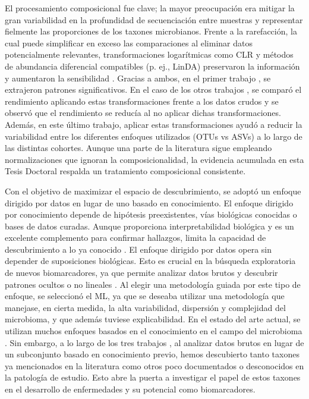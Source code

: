El procesamiento composicional fue clave; la mayor preocupación era mitigar la gran variabilidad en la profundidad de secuenciación entre muestras y representar fielmente las proporciones de los taxones microbianos. Frente a la rarefacción, la cual puede simplificar en exceso las comparaciones al eliminar datos potencialmente relevantes, transformaciones logarítmicas como CLR y métodos de abundancia diferencial compatibles (p. ej., LinDA) preservaron la información y aumentaron la sensibilidad \cite{gloor2016compositional, gloor2017microbiome, hong2022rarefy, zhou2022linda}. Gracias a ambos, en el primer trabajo \cite{paper1}, se extrajeron patrones significativos. En el caso de los otros trabajos \cite{paper2, paper3}, se comparó el rendimiento aplicando estas transformaciones frente a los datos crudos y se observó que el rendimiento se reducía al no aplicar dichas transformaciones. Además, en este último trabajo, aplicar estas transformaciones ayudó a reducir la variabilidad entre los diferentes enfoques utilizados (OTUs vs ASVs) a lo largo de las distintas cohortes. Aunque una parte de la literatura \cite{lambeth2015composition, dash2023functional, siptroth2023variation, chen2018vaginal, onywera2021predictive} sigue empleando normalizaciones que ignoran la composicionalidad, la evidencia acumulada en esta Tesis Doctoral respalda un tratamiento composicional consistente.



Con el objetivo de maximizar el espacio de descubrimiento, se adoptó un enfoque dirigido por datos en lugar de uno basado en conocimiento. El enfoque dirigido por conocimiento depende de hipótesis preexistentes, vías biológicas conocidas o bases de datos curadas. Aunque proporciona interpretabilidad biológica y es un excelente complemento para confirmar hallazgos, limita la capacidad de descubrimiento a lo ya conocido \cite{dakal2025advanced}. El enfoque dirigido por datos opera sin depender de suposiciones biológicas. Esto es crucial en la búsqueda exploratoria de nuevos biomarcadores, ya que permite analizar datos brutos y descubrir patrones ocultos o no lineales \cite{hemmati2024using}. Al elegir una metodología guiada por este tipo de enfoque, se seleccionó el ML, ya que se deseaba utilizar una metodología que manejase, en cierta medida, la alta variabilidad, dispersión y complejidad del microbioma, y que además tuviese explicabilidad. En el estado del arte actual, se utilizan muchos enfoques basados en el conocimiento en el campo del microbioma \cite{chong2017computational, bauer2018network, luo2024progress}. Sin embargo, a lo largo de los tres trabajos \cite{paper1, paper2, paper3}, al analizar datos brutos en lugar de un subconjunto basado en conocimiento previo, hemos descubierto tanto taxones ya mencionados en la literatura como otros poco documentados o desconocidos en la patología de estudio. Esto abre la puerta a investigar el papel de estos taxones en el desarrollo de enfermedades y su potencial como biomarcadores.



